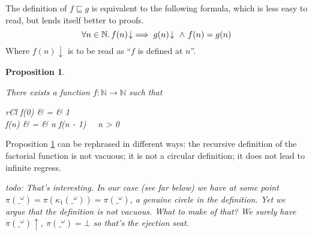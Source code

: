 \documentclass[a4paper]{article}
\newcommand{\below}{\sqsubseteq}
\newcommand{\arr}{\rightarrow}
\newcommand{\todo}[1]{\smallskip \noindent \emph{todo: #1} \smallskip}
\newcommand{\isdefined}{\!\downarrow}
\newtheorem{proposition}[definition]{Proposition}
\begin{document}
The definition of $f \below g$ is equivalent to the following formula, which is
less easy to read, but lends itself better to proofs.
\begin{equation*}
\forall n \in \mathbb{N} \ldotp f(n)\isdefined \implies g(n)\isdefined\
\wedge\ f(n) = g(n)
\end{equation*}
Where $f(n)\isdefined$ is to be read as ``$f$ is defined at $n$''.



\begin{proposition} \label{propFactorialExists}

There exists a function $f : \mathbb{N} \arr \mathbb{N}$ such that
\begin{IEEEeqnarray}{rCl}
f(0) & = & 1 \label{eqnFactorial1} \\
f(n) & = & n \cdot f(n - 1) \quad{}\ \ n > 0 \label{eqnFactorial2}
\end{IEEEeqnarray}

\end{proposition}

Proposition \ref{propFactorialExists} can be rephrased in different ways: the
recursive definition of the factorial function is not vacuous; it is not a
circular definition; it does not lead to infinite regress.

\todo{
That's interesting. In our case (see far below) we have at some point
$\pi(\_^\omega) = \pi(\kappa_1(\_^\omega)) = \pi(\_^\omega)$, a genuine circle
in the definition.  Yet we argue that the definition is not vacuous. What to
make of that? We surely have $\pi(\_^\omega)\!\uparrow$, $\pi(\_^\omega) = \bot$
so that's the ejection seat.
}
\end{document}
